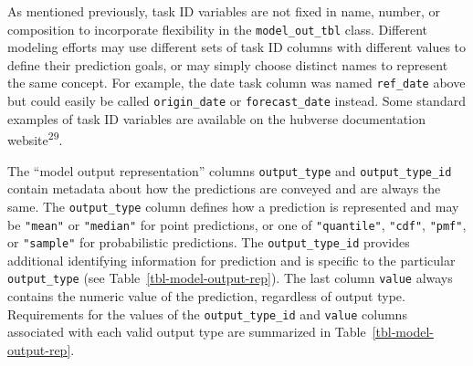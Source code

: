 \documentclass[
  letterpaper,
  DIV=11,
  numbers=noendperiod]{scrartcl}
\begin{document}
As mentioned previously, task ID variables are not fixed in name,
number, or composition to incorporate flexibility in the
\texttt{model\_out\_tbl} class. Different modeling efforts may use
different sets of task ID columns with different values to define their
prediction goals, or may simply choose distinct names to represent the
same concept. For example, the date task column was named
\texttt{ref\_date} above but could easily be called
\texttt{origin\_date} or \texttt{forecast\_date} instead. Some standard
examples of task ID variables are available on the hubverse
documentation website\textsuperscript{29}.

The ``model output representation'' columns \texttt{output\_type} and
\texttt{output\_type\_id} contain metadata about how the predictions are
conveyed and are always the same. The \texttt{output\_type} column
defines how a prediction is represented and may be \texttt{"mean"} or
\texttt{"median"} for point predictions, or one of \texttt{"quantile"},
\texttt{"cdf"}, \texttt{"pmf"}, or \texttt{"sample"} for probabilistic
predictions. The \texttt{output\_type\_id} provides additional
identifying information for prediction and is specific to the particular
\texttt{output\_type} (see Table~\ref{tbl-model-output-rep}). The last
column \texttt{value} always contains the numeric value of the
prediction, regardless of output type. Requirements for the values of
the \texttt{output\_type\_id} and \texttt{value} columns associated with
each valid output type are summarized in
Table~\ref{tbl-model-output-rep}.
\end{document}
